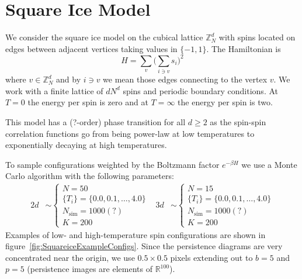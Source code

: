 \documentclass[11pt]{article}
\begin{document}
\newpage
\section{Square Ice Model}
We consider the square ice model on the cubical lattice $\mathbb{Z}_N^d$ with spins located on edges between adjacent vertices taking values in $\{{-1},1\}$. The Hamiltonian is
\begin{equation}
    H = \sum_v\Big(\sum_{i\ni v}s_i\Big)^2
\end{equation}
where $v\in\mathbb{Z}_N^d$ and by $i\ni v$ we mean those edges connecting to the vertex $v$. We work with a finite lattice of $dN^d$ spins and periodic boundary conditions. At $T=0$ the energy per spin is zero and at $T=\infty$ the energy per spin is two.

This model has a (?-order) phase transition for all $d\geq 2$ as the spin-spin correlation functions go from being power-law at low temperatures to exponentially decaying at high temperatures.

To sample configurations weighted by the Boltzmann factor $e^{-\beta H}$ we use a Monte Carlo algorithm with the following parameters:
\begin{align}
    2d&\sim\left\{\begin{array}{l}
        N = 50\\
        \{T_i\} = \{0.0,0.1,\ldots,4.0\}\\
        N_\text{sim} = 1000(?)\\
        K = 200
    \end{array}\right. & 3d&\sim\left\{\begin{array}{l}
        N = 15\\
        \{T_i\} = \{0.0,0.1,\ldots,4.0\}\\
        N_\text{sim} = 1000(?)\\
        K = 200
    \end{array}\right.
\end{align}
Examples of low- and high-temperature spin configurations are shown in figure~\ref{fig:SquareiceExampleConfigs}. Since the persistence diagrams are very concentrated near the origin, we use $0.5\times0.5$ pixels extending out to $b=5$ and $p=5$ (persistence images are elements of $\mathbb{R}^{100}$).
\end{document}
